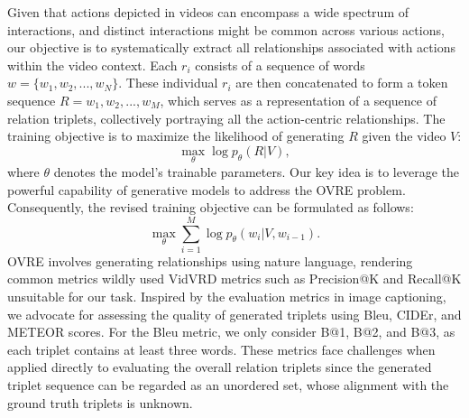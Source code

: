 \documentclass[letterpaper]{article}
\begin{document}

Given that actions depicted in videos can encompass a wide spectrum of interactions, and distinct interactions might be common across various actions, our objective is to systematically extract all relationships associated with actions within the video context. 
Each $r_{i}$ consists of a sequence of words $w=\{w_{1},w_{2},...,w_{N}\}$. These individual $r_{i}$ are then concatenated to form a token sequence $R=w_{1},w_{2},...,w_{M}$, which serves as a representation of a sequence of relation triplets, collectively portraying all the action-centric relationships.
The training objective is to maximize the likelihood of generating $R$ given the video $V$:
$$
\underset{\theta}{\max} \log p_{\theta}(R|V),
$$
where $\theta$ denotes the model's trainable parameters.
Our key idea is to leverage the powerful capability of generative models to address the OVRE problem. 
Consequently, the revised training objective can be formulated as follows:
$$
\underset{\theta}{\max}\sum_{i=1}^{M}\log p_{\theta}(w_{i}|V,w_{i-1}).
$$
OVRE involves generating relationships using nature language, rendering common metrics wildly used VidVRD metrics such as Precision@K and Recall@K unsuitable for our task.
Inspired by the evaluation metrics in image captioning, we advocate for assessing the quality of generated triplets using Bleu, CIDEr, and METEOR scores.
For the Bleu metric, we only consider B@1, B@2, and B@3, as each triplet contains at least three words.
These metrics face challenges when applied directly to evaluating the overall relation triplets since the generated triplet sequence can be regarded as an unordered set, whose alignment with the ground truth triplets is unknown. 
\end{document}
